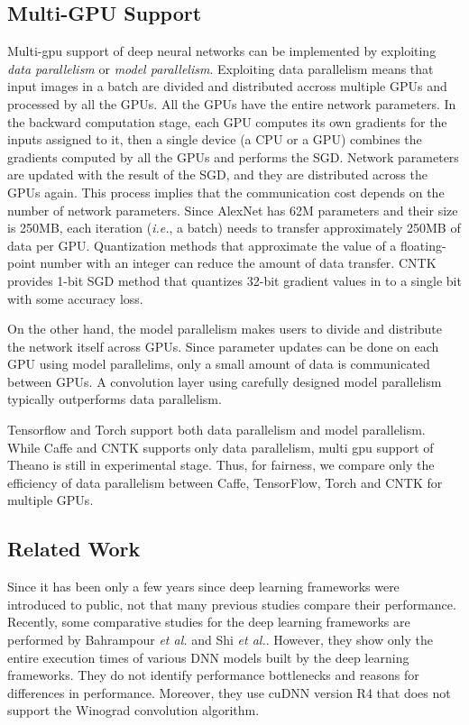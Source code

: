 \subsection{Multi-GPU Support}
\label{sec:multiGPU-parallelism}
Multi-gpu support of deep neural networks can be implemented by exploiting \textit{data parallelism} or \textit{model parallelism}\cite{NIPS2012_4687}. Exploiting data parallelism means that input images in a batch are divided and distributed accross multiple GPUs and processed by all the GPUs. All the GPUs have the entire network parameters. In the backward computation stage, each GPU computes its own gradients for the inputs assigned to it, then a single device (a CPU or a GPU) combines the gradients computed by all the GPUs and performs the SGD. Network parameters are updated with the result of the SGD, and they are distributed across the GPUs again. This process implies that the communication cost depends on the number of network parameters. Since AlexNet has 62M parameters and their size is 250MB, each iteration (\textit{i.e.}, a batch) needs to transfer approximately 250MB of data per GPU. Quantization methods that approximate the value of a floating-point number with an integer can reduce the amount of data transfer\cite{deepcompress}. CNTK provides 1-bit SGD method that quantizes 32-bit gradient values in to a single bit with some accuracy loss\cite{1-bit-stochastic-gradient-descent-and-application-to-data-parallel-distributed-training-of-speech-dnns}.

On the other hand, the model parallelism makes users to divide and distribute the network itself across GPUs. Since parameter updates can be done on each GPU using model parallelims, only a small amount of data is communicated between GPUs. A convolution layer using carefully designed model parallelism typically outperforms data parallelism\cite{DBLP:journals/corr/YadanATR13}.

Tensorflow and Torch support both data parallelism and model parallelism. While Caffe and CNTK supports only data parallelism, multi gpu support of Theano is still in experimental stage. Thus, for fairness, we compare only the efficiency of data parallelism between Caffe, TensorFlow, Torch and CNTK for multiple GPUs. 

\subsection{Related Work}
Since it has been only a few years since deep learning frameworks were introduced to public, not that many previous studies compare their performance. Recently, some comparative studies for the deep learning frameworks are performed by Bahrampour \textit{et al.}\cite{DBLP:journals/corr/BahrampourRSS15} and Shi \textit{et al.}\cite{DBLP:journals/corr/ShiWXC16}. However, they show only the entire execution times of various DNN models built by the deep learning frameworks. They do not identify performance bottlenecks and reasons for differences in performance. Moreover, they use cuDNN version R4 that does not support the Winograd convolution algorithm.


